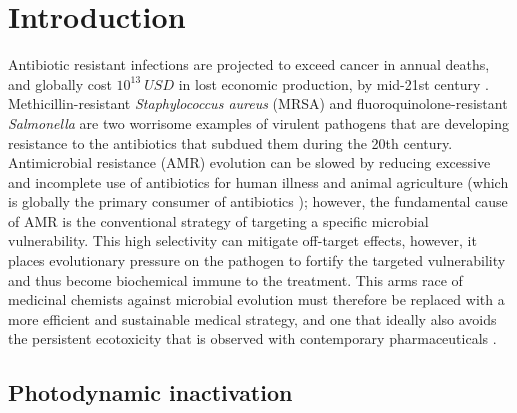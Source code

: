 \label{PDIpy_chapter}

\section{Introduction}
Antibiotic resistant infections are projected to exceed cancer in annual deaths, and globally cost $10^{13}~USD$ in lost economic production, by mid-21st century \cite{ONeill2014AntimicrobialNations}. Methicillin-resistant \textit{Staphylococcus aureus} (MRSA) \cite{Song2011SpreadStudy,Borg2007PrevalenceCountries} and fluoroquinolone-resistant \textit{Salmonella} \cite{Moghnieh2018EpidemiologyLeague} are two worrisome examples of virulent pathogens that are developing resistance to the antibiotics that subdued them during the 20th century. Antimicrobial resistance (AMR) evolution can be slowed by reducing excessive and incomplete use of antibiotics for human illness and animal agriculture (which is globally the primary consumer of antibiotics \cite{VanBoeckel2017ReducingAnimals,Eggleton2020TheWorld}); however, the fundamental cause of AMR is the conventional strategy of targeting a specific microbial vulnerability. This high selectivity can mitigate off-target effects, however, it places evolutionary pressure on the pathogen to fortify the targeted vulnerability and thus become biochemical immune to the treatment. This arms race of medicinal chemists against microbial evolution must therefore be replaced with a more efficient and sustainable medical strategy, and one that ideally also avoids the persistent ecotoxicity that is observed with contemporary pharmaceuticals \cite{Thomas2001AntifoulingEffects,Niu2016RolesIrradiation,Winters1983ControlDesalination}.

\subsection{Photodynamic inactivation}

